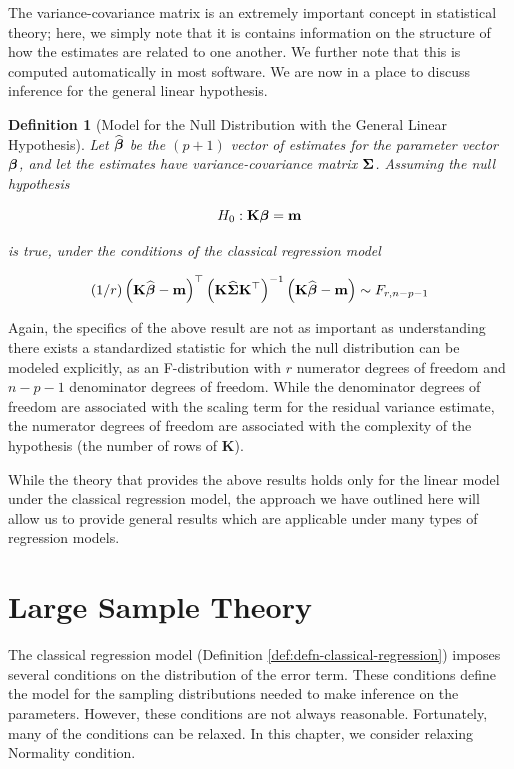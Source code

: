 \documentclass[
]{book}
\theoremstyle{plain}
\theoremstyle{mydefn}
\newtheorem{definition}{Definition}[chapter]
\theoremstyle{myexmpl}
\theoremstyle{remark}
\begin{document}
The variance-covariance matrix is an extremely important concept in statistical theory; here, we simply note that it is contains information on the structure of how the estimates are related to one another. We further note that this is computed automatically in most software. We are now in a place to discuss inference for the general linear hypothesis.

\begin{definition}[Model for the Null Distribution with the General Linear Hypothesis]
\protect\hypertarget{def:defn-general-linear-hypothesis-null}{}{\label{def:defn-general-linear-hypothesis-null} {} }Let \(\widehat{\boldsymbol{\beta}}\) be the \((p+1)\) vector of estimates for the parameter vector \(\boldsymbol{\beta}\), and let the estimates have variance-covariance matrix \(\boldsymbol{\Sigma}\). Assuming the null hypothesis

\[H_0: \mathbf{K} \boldsymbol{\beta} = \mathbf{m}\]

is true, under the conditions of the classical regression model

\[(1/r) \left(\mathbf{K}\widehat{\boldsymbol{\beta}} - \mathbf{m}\right)^\top \left(\mathbf{K}\widehat{\boldsymbol{\Sigma}}\mathbf{K}^\top\right)^{-1} \left(\mathbf{K}\widehat{\boldsymbol{\beta}} - \mathbf{m}\right) \sim F_{r, n-p-1}\]
\end{definition}

Again, the specifics of the above result are not as important as understanding there exists a standardized statistic for which the null distribution can be modeled explicitly, as an F-distribution with \(r\) numerator degrees of freedom and \(n-p-1\) denominator degrees of freedom. While the denominator degrees of freedom are associated with the scaling term for the residual variance estimate, the numerator degrees of freedom are associated with the complexity of the hypothesis (the number of rows of \(\bm{K}\)).

While the theory that provides the above results holds only for the linear model under the classical regression model, the approach we have outlined here will allow us to provide general results which are applicable under many types of regression models.

\hypertarget{glm-large-sample-theory}{%
\chapter{Large Sample Theory}\label{glm-large-sample-theory}}

The classical regression model (Definition \ref{def:defn-classical-regression}) imposes several conditions on the distribution of the error term. These conditions define the model for the sampling distributions needed to make inference on the parameters. However, these conditions are not always reasonable. Fortunately, many of the conditions can be relaxed. In this chapter, we consider relaxing Normality condition.
\end{document}
